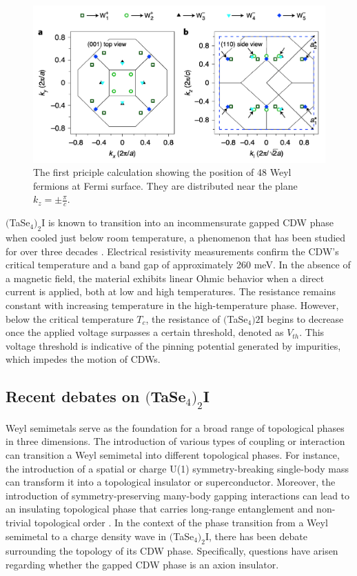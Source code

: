 \begin{figure}[h]
    \centering
    \includegraphics[width =\textwidth]{images/FSWPs.png}
    \caption{The first priciple calculation showing the position of 48 Weyl fermions at Fermi surface. They are distributed near the plane $k_z=\pm\frac{\pi}{c}$. \cite{shi2021charge}}
    \label{fig:FSWPs}
\end{figure}

$($TaSe$_4)_2$I is known to transition into an incommensurate gapped CDW phase when cooled just below room temperature, a phenomenon that has been studied for over three decades \cite{gressier1982preparation,tournier2013electronic}. Electrical resistivity measurements confirm the CDW's critical temperature and a band gap of approximately 260 meV. In the absence of a magnetic field, the material exhibits linear Ohmic behavior when a direct current is applied, both at low and high temperatures. The resistance remains constant with increasing temperature in the high-temperature phase. However, below the critical temperature $T_c$, the resistance of $($TaSe$_4)2$I begins to decrease once the applied voltage surpasses a certain threshold, denoted as $V_{th}$. This voltage threshold is indicative of the pinning potential generated by impurities, which impedes the motion of CDWs.



\subsection{Recent debates on $($TaSe$_4)_2$I}
Weyl semimetals serve as the foundation for a broad range of topological phases in three dimensions. The introduction of various types of coupling or interaction can transition a Weyl semimetal into different topological phases. For instance, the introduction of a spatial or charge U(1) symmetry-breaking single-body mass can transform it into a topological insulator or superconductor. Moreover, the introduction of symmetry-preserving many-body gapping interactions can lead to an insulating topological phase that carries long-range entanglement and non-trivial topological order \cite{raza2019dirac}. In the context of the phase transition from a Weyl semimetal to a charge density wave  in $($TaSe$_4)_2$I, there has been debate surrounding the topology of its CDW phase. Specifically, questions have arisen regarding whether the gapped CDW phase is an axion insulator.

